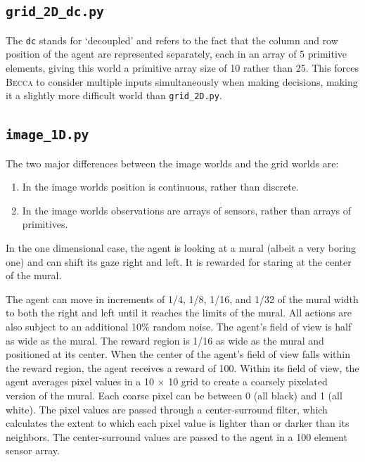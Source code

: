 \subsection{\texttt{grid\_2D\_dc.py}}

The \texttt{dc} stands for `decoupled' and refers to the fact that the column and row position of the agent are represented separately, each in an array of 5 primitive elements, giving this world a primitive array size of 10 rather than 25. This forces \textsc{Becca} to consider multiple inputs simultaneously when making decisions, making it a slightly more difficult world than \texttt{grid\_2D.py}.

\subsection{\texttt{image\_1D.py}}

The two major differences between the image worlds and the grid worlds are:

\begin{enumerate}
\item In the image worlds position is continuous, rather than discrete.
\item In the image worlds observations are arrays of sensors, rather than arrays of primitives.
\end{enumerate}

In the one dimensional case, the agent is looking at a mural (albeit a very boring one) and can shift its gaze right and left. It is rewarded for staring at the center of the mural.

The agent can move in increments of 1/4, 1/8, 1/16, and 1/32 of the mural width to both the right and left until it reaches the limits of the mural. All actions are also subject to an additional 10\% random noise. The agent's field of view is half as wide as the mural. The reward region is 1/16 as wide as the mural and positioned at its center. When the center of the agent's field of view falls within the reward region, the agent receives a reward of 100. Within its field of view, the agent averages pixel values in a 10 $\times$ 10 grid to create a coarsely pixelated version of the mural. Each coarse pixel can be between 0 (all black) and 1 (all white). The pixel values are passed through a center-surround filter, which calculates the extent to which each pixel value is lighter than or darker than its neighbors. The center-surround values are passed to the agent in a 100 element sensor array.

